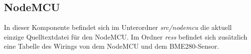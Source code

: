 \subsection{NodeMCU}
In dieser Komponente befindet sich im Unterordner \textit{src/nodemcu} die aktuell einzige Quelltextdatei für den NodeMCU.
Im Ordner \textit{ress} befindet sich zusätzlich eine Tabelle des Wirings von dem NodeMCU und dem BME280-Sensor.





